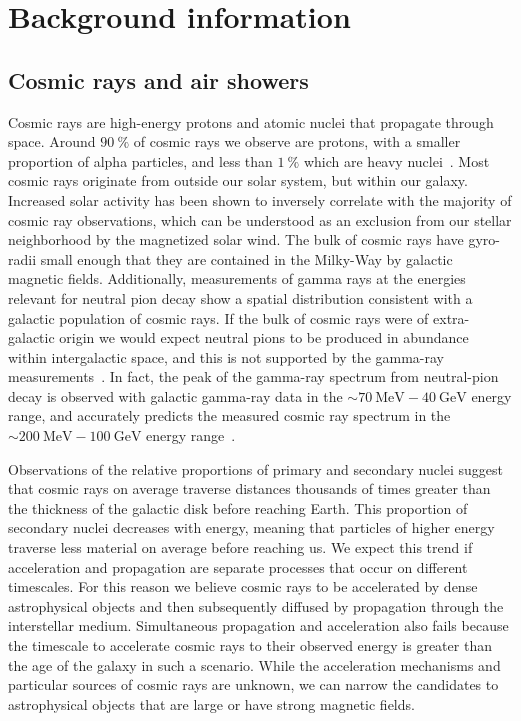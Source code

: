 \chapter{Background information}\label{chapter:background}

\section{Cosmic rays and air showers}

Cosmic rays are high-energy protons and atomic nuclei that propagate through space.
Around $\SI{90}\percent$ of cosmic rays we observe are protons, with a smaller proportion of alpha particles, and less than $\SI{1}\percent$ which are heavy nuclei~\cite{Gaisser:2016uoy}.
Most cosmic rays originate from outside our solar system, but within our galaxy.
Increased solar activity has been shown to inversely correlate with the majority of cosmic ray observations, which can be understood as an exclusion from our stellar neighborhood by the magnetized solar wind.
The bulk of cosmic rays have gyro-radii small enough that they are contained in the Milky-Way by galactic magnetic fields.
Additionally, measurements of gamma rays at the energies relevant for neutral pion decay show a spatial distribution consistent with a galactic population of cosmic rays.
If the bulk of cosmic rays were of extra-galactic origin we would expect neutral pions to be produced in abundance within intergalactic space, and this is not supported by the gamma-ray measurements~\cite{Abdo:2009mr}.
In fact, the peak of the gamma-ray spectrum from neutral-pion decay is observed with galactic gamma-ray data in the $\sim\SI{70}\MeV-\SI{40}\GeV$ energy range, and accurately predicts the measured cosmic ray spectrum in the $\sim\SI{200}\MeV-\SI{100}\GeV$ energy range~\cite{Dermer:2013iwa}.

Observations of the relative proportions of primary and secondary nuclei suggest that cosmic rays on average traverse distances thousands of times greater than the thickness of the galactic disk before reaching Earth.
This proportion of secondary nuclei decreases with energy, meaning that particles of higher energy traverse less material on average before reaching us.
We expect this trend if acceleration and propagation are separate processes that occur on different timescales.
For this reason we believe cosmic rays to be accelerated by dense astrophysical objects and then subsequently diffused by propagation through the interstellar medium.
Simultaneous propagation and acceleration also fails because the timescale to accelerate cosmic rays to their observed energy is greater than the age of the galaxy in such a scenario.
While the acceleration mechanisms and particular sources of cosmic rays are unknown, we can narrow the candidates to astrophysical objects that are large or have strong magnetic fields.

